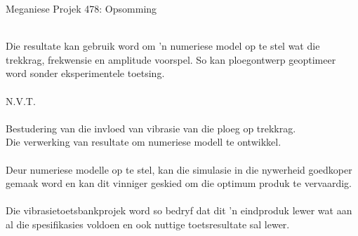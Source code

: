 \begin{Summary}{Meganiese Projek 478: Opsomming}
\begin{SumTable}
 \hline%
 \\
 \hline%
    Die resultate kan gebruik word om 'n numeriese model op te
    stel wat die trekkrag, frekwensie en amplitude voorspel. So
    kan ploegontwerp geoptimeer word sonder eksperimentele
    toetsing.\\

 \hline%
 \\
 \hline%
    N.V.T.\\

 \hline%
 \\
 \hline%
    Bestudering van die invloed van vibrasie van die ploeg op
    trekkrag.\\

    Die verwerking van resultate om numeriese modell te
    ontwikkel.\\

 \hline%
 \\
 \hline%
    Deur numeriese modelle op te stel, kan die simulasie in die
    nywerheid goedkoper gemaak word en kan dit vinniger geskied om
    die optimum produk te vervaardig.\\

 \hline%
 \\
 \hline%
    Die vibrasietoetsbankprojek word so bedryf dat dit 'n
    eindproduk lewer wat aan al die spesifikasies voldoen en ook
    nuttige toetsresultate sal lewer.\\

 \hline%
\end{SumTable}


\vspace{1.5cm}
\SumSignatures

\end{Summary}

\endinput
